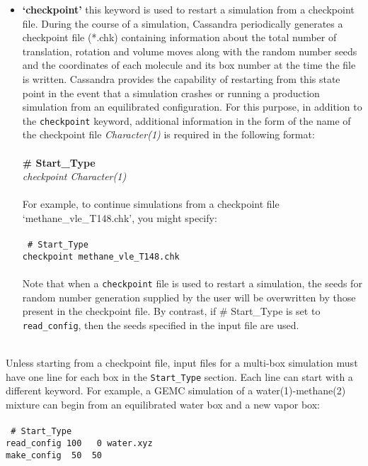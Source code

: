 \begin{itemize}
\item \textbf{`checkpoint'} this keyword is used to restart a simulation from a checkpoint file.
During the course of a simulation, Cassandra periodically generates a checkpoint file (*.chk)
 containing information about the total number of translation, rotation and volume moves along with the random number seeds and 
the coordinates of each molecule and its box number at the time the file is written. Cassandra provides
the capability of restarting from this state point in the event that a simulation crashes or 
running a production simulation from an equilibrated configuration. For this
purpose, in addition to the {\tt checkpoint} keyword, additional information in the form of the name of 
the checkpoint file {\it Character(1)} is required in the following format: \\ \\
%
{\bf \# Start\_Type} \\
{\it checkpoint Character(1)} \\ \\
%
For example, to continue simulations from a checkpoint file `methane\_vle\_T148.chk', you might specify: \\ \\
%
\texttt{
\# Start\_Type \\
checkpoint methane\_vle\_T148.chk \\ } \\
%
Note that when a {\tt checkpoint} file is used to restart a simulation, the seeds for random number generation supplied by the user
will be overwritten by those present in the checkpoint file. By contrast, if \# Start\_Type is set to {\tt read\_config}, 
then the seeds specified in the input file are used.  \\ \\
%
\end{itemize}
Unless starting from a checkpoint file, input files for a multi-box simulation must have one line for each box in the \texttt{Start\_Type} section. Each line can start with a different keyword. For example, a GEMC simulation of a water(1)-methane(2) mixture can begin from an equilibrated water box and a new vapor box: \\ \\
%
\texttt{
\# Start\_Type \\
read\_config 100 \ \ 0 water.xyz \\
make\_config \ 50 \ 50 \\}
%
%
%
